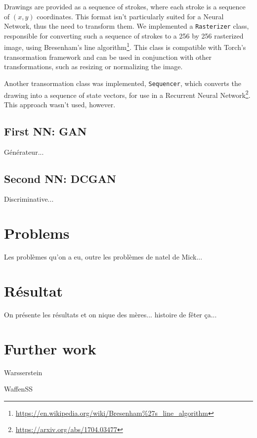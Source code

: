 \documentclass[
  10pt, 
  a4paper,
  oneside, 
  headinclude, 
  footinclude, 
  BCOR5mm, 
]{scrartcl}
\begin{document}
Drawings are provided as a sequence of strokes, where each stroke is a sequence
of $(x, y)$ coordinates. This format isn't particularly suited for a Neural
Network, thus the need to transform them. We implemented a \texttt{Rasterizer}
class, responsible for converting such a sequence of strokes to a 256 by 256
rasterized image, using Bresenham's line
algorithm\footnote{\url{https://en.wikipedia.org/wiki/Bresenham\%27s_line_algorithm}}.
This class is compatible with Torch's transormation framework and can be used in
conjunction with other transformations, such as resizing or normalizing the image.

Another transormation class was implemented, \texttt{Sequencer}, which converts
the drawing into a sequence of state vectors, for use in a Recurrent Neural
Network\footnote{\url{https://arxiv.org/abs/1704.03477}}. This approach wasn't
used, however.

\subsection{First NN: GAN}

Générateur...

\subsection{Second NN: DCGAN}

Discriminative...


\section{Problems}

Les problèmes qu'on a eu, outre les problèmes de natel de Mick...


\section{Résultat}

On présente les résultats et on nique des mères... histoire de fêter ça...


\section{Further work}

Warsserstein

WaffenSS


\newpage

\tableofcontents
\listoffigures
\listoftables

\begin{thebibliography}{9}
\end{thebibliography}
\end{document}
